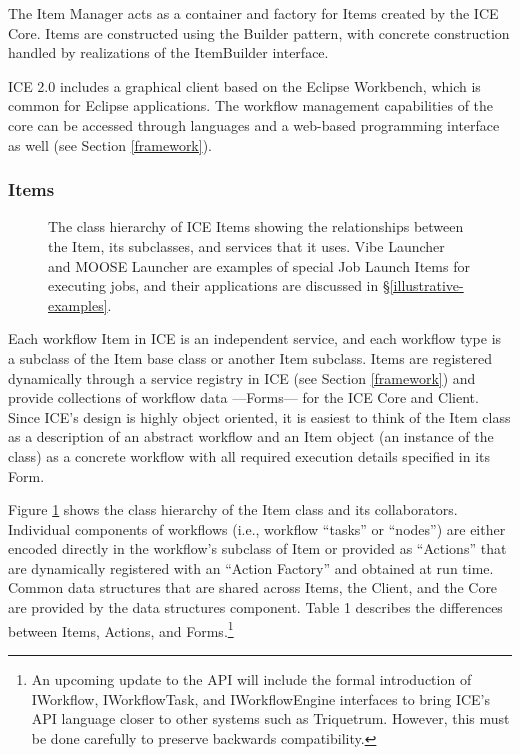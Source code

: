 The Item Manager acts as a container and factory for Items created by the ICE
Core. Items are constructed using the Builder pattern, with concrete
construction handled by realizations of the ItemBuilder interface.

ICE 2.0 includes a graphical client based on the Eclipse Workbench, which is
common for Eclipse applications. The workflow management capabilities of the
core can be accessed through languages and a web-based programming interface as
well (see Section \ref{framework}).

\subsubsection{Items}
\label{item}
\label{item-states}

\begin{figure}[htbp]
\centering
{}
\caption{The class hierarchy of ICE Items showing the relationships between the
Item, its subclasses, and services that it uses. Vibe Launcher and MOOSE
Launcher are examples of special Job Launch Items for executing jobs, and their
applications are discussed in \S \ref{illustrative-examples}.}
\label{item-arch}
\end{figure}

Each workflow Item in ICE is an independent service, and each workflow type is a
subclass of the Item base class or another Item subclass. Items are registered
dynamically through a service registry in ICE (see Section \ref{framework}) and
provide collections of workflow data ---Forms--- for the ICE Core and Client.
Since ICE's design is highly object oriented, it is easiest to think of the Item class
as a description of an abstract workflow and an Item object (an instance of the
class) as a concrete workflow with all required execution details specified in
its Form.

Figure \ref{item-arch} shows the class hierarchy of the Item class and its
collaborators.
Individual components of workflows (i.e., workflow ``tasks'' or ``nodes'') are
either encoded directly in the workflow's subclass of Item or provided as
``Actions'' that are dynamically registered with an ``Action Factory'' and
obtained at run time. Common data structures that are shared across Items, the
Client, and the Core are provided by the data structures component. Table 1
describes the differences between Items, Actions, and Forms.\footnote{An
upcoming update to the API will include the formal introduction of IWorkflow,
IWorkflowTask, and IWorkflowEngine interfaces to bring ICE's API language closer
to other systems such as Triquetrum. However, this must be done carefully to
preserve backwards compatibility.}

